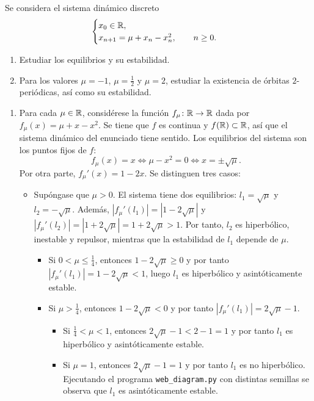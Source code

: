 \documentclass[11pt]{report}
\begin{document}
\begin{exercise}[Junio de 2023]
    Se considera el sistema dinámico discreto
    \[\begin{cases}
        x_0\in\mathbb R, \\
        x_{n+1} = \mu + x_n-x_n^2, \qquad n \geq 0.
    \end{cases}\]
    \begin{enumerate}
        \item Estudiar los equilibrios y su estabilidad.
        \item Para los valores $\mu = -1$, $\mu = \frac{1}{2}$ y $\mu = 2$, estudiar la existencia de órbitas $2$-periódicas, así como su estabilidad.
    \end{enumerate}
\end{exercise}

\begin{solution}
    \hfill
    \begin{enumerate}
        \item Para cada $\mu\in\mathbb R$, considérese la función $f_\mu\colon\mathbb R\to\mathbb R$ dada por $f_\mu(x) = \mu+x-x^2$. Se tiene que $f$ es continua y $f(\mathbb R)\subset\mathbb R$, así que el sistema dinámico del enunciado tiene sentido. Los equilibrios del sistema son los puntos fijos de $f$:
        \[f_\mu(x) = x \iff \mu-x^2 = 0 \iff x = \pm\sqrt{\mu}.\]
        Por otra parte, $f_\mu'(x) = 1-2x$. Se distinguen tres casos:
        \begin{itemize}
            \item Supóngase que $\mu > 0$. El sistema tiene dos equilibrios: $l_1 = \sqrt{\mu}$ y $l_2 = -\sqrt{\mu}$. Además, $|f_\mu'(l_1)| = |1-2\sqrt{\mu}|$ y $|f_\mu'(l_2)| = |1+2\sqrt{\mu}| = 1+2\sqrt{\mu} > 1$. Por tanto, $l_2$ es hiperbólico, inestable y repulsor, mientras que la estabilidad de $l_1$ depende de $\mu$.
            \begin{itemize}
                \item Si $0 < \mu \leq \frac{1}{4}$, entonces $1-2\sqrt{\mu} \geq 0$ y por tanto $|f_\mu'(l_1)| = 1-2\sqrt{\mu} < 1$, luego $l_1$ es hiperbólico y asintóticamente estable.
                \item Si $\mu > \frac{1}{4}$, entonces $1-2\sqrt{\mu} < 0$ y por tanto $|f_\mu'(l_1)| = 2\sqrt{\mu} -1$.
                \begin{itemize}
                    \item Si $\frac{1}{4}<\mu < 1$, entonces $2\sqrt{\mu}-1 < 2-1 = 1$ y por tanto $l_1$ es hiperbólico y asintóticamente estable.
                    \item Si $\mu = 1$, entonces $2\sqrt{\mu}-1 = 1$ y por tanto $l_1$ es no hiperbólico. Ejecutando el programa \texttt{web\_diagram.py} con distintas semillas se observa que $l_1$ es asintóticamente estable.

\end{itemize}
\end{itemize}
\end{itemize}
\end{enumerate}
\end{solution}
\end{document}
